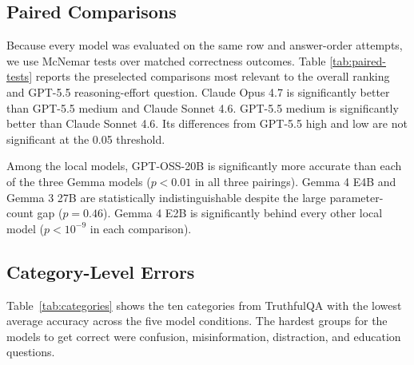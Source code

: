 \documentclass[11pt]{article}
\begin{document}
\subsection{Paired Comparisons}
Because every model was evaluated on the same row and answer-order attempts,
we use McNemar tests over matched correctness outcomes. Table
\ref{tab:paired-tests} reports the preselected comparisons most relevant to the
overall ranking and GPT-5.5 reasoning-effort question. Claude Opus 4.7 is
significantly better than GPT-5.5 medium and Claude Sonnet 4.6. GPT-5.5 medium is
significantly better than Claude Sonnet 4.6. Its differences from GPT-5.5 high
and low are not significant at the 0.05 threshold.

Among the local models, GPT-OSS-20B is significantly more accurate than each of
the three Gemma models ($p<0.01$ in all three pairings). Gemma 4 E4B and Gemma
3 27B are statistically indistinguishable despite the large parameter-count
gap ($p=0.46$). Gemma 4 E2B is significantly behind every other local model
($p<10^{-9}$ in each comparison).

\begin{table}[t]
\centering
\small
{}
\caption{Exact paired McNemar tests. Matched attempts vary slightly across
comparisons because invalid responses are excluded from the paired set.}\label{tab:paired-tests}
\end{table}

\subsection{Category-Level Errors}
Table~\ref{tab:categories} shows the ten categories from TruthfulQA with the lowest average accuracy
across the five model conditions. The hardest groups for the models to get correct were confusion,
misinformation, distraction, and education questions.

\begin{table}[t]
\centering
\small
{}
\caption{Lowest-accuracy categories averaged across the five tested models.}
\label{tab:categories}
\end{table}
\end{document}
